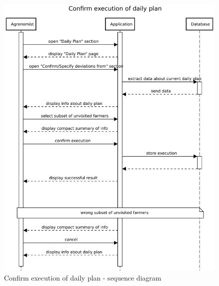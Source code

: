 \begin{figure}[H]
    \centering
    \includegraphics[scale=0.75]{Images/Sequence diagrams/Agronomist - confirm execution of daily plan.pdf}
    \caption{Confirm execution of daily plan - sequence diagram}
    \label{fig:my_label}
\end{figure}